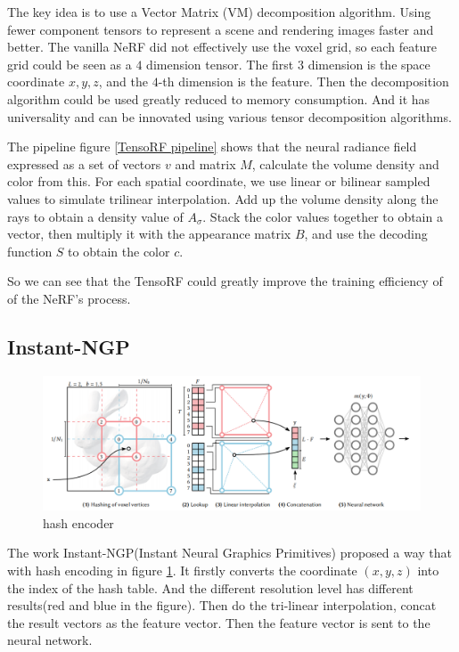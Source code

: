 The key idea is to use a Vector Matrix (VM) decomposition algorithm. Using fewer component tensors to represent a scene and rendering images faster and better. The vanilla NeRF did not effectively use the voxel grid, so each feature grid could be seen as a $4$ dimension tensor. The first $3$ dimension is the space coordinate $x,y,z$, and the $4$-th dimension is the feature. Then the decomposition algorithm could be used greatly reduced to memory consumption. And it has universality and can be innovated using various tensor decomposition algorithms.

The pipeline figure \ref{TensoRF pipeline} shows that the neural radiance field expressed as a set of vectors $v$ and matrix $M$, calculate the volume density and color from this. For each spatial coordinate, we use linear or bilinear sampled values to simulate trilinear interpolation. Add up the volume density along the rays to obtain a density value of $A_{\sigma}$. Stack the color values together to obtain a vector, then multiply it with the appearance matrix $B$, and use the decoding function $S$ to obtain the color $c$.

So we can see that the TensoRF could greatly improve the training efficiency of of the NeRF's process. 

\subsection{Instant-NGP}
\label{instant ngp paper reading}

\begin{figure}[htbp]
\centering
\includegraphics[width=0.9\linewidth]{img/hash_encoder.png}
\caption{hash encoder}
\label{hash encoder}
\end{figure}

The work Instant-NGP(Instant Neural Graphics Primitives) \cite{instant-ngp} proposed a way that with hash encoding in figure \ref{hash encoder}. It firstly converts the coordinate $(x,y,z)$ into the index of the hash table. And the different resolution level has different results(red and blue in the figure). Then do the tri-linear interpolation, concat the result vectors as the feature vector. Then the feature vector is sent to the neural network. 

